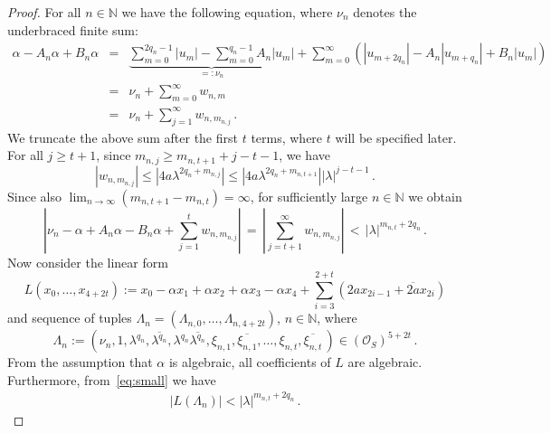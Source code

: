 \documentclass[a4paper,UKenglish,cleveref, autoref, thm-restate]{lipics-v2021}
\begin{document}
\begin{proof}
For all $n\in \mathbb N$ we have the following equation, where $\nu_n$ denotes the underbraced finite sum:
\begin{eqnarray*}
    \alpha - A_n \alpha + B_n \alpha &=& 
    \underbrace{\sum_{m=0}^{2q_n-1} |u_m| -\sum_{m=0}^{q_n-1} A_n|u_m|}_{=:\nu_n}+
    \sum_{m=0}^\infty \left(|u_{m+2q_n}|-A_n|u_{m+q_n}|+B_n|u_m| \right)\\
    &=& \nu_n +\sum_{m=0}^\infty w_{n,m}\\
    &=& \nu_n + \sum_{j=1}^\infty w_{n,m_{n,j}} \, .
\end{eqnarray*}
We truncate the above sum after the first $t$ terms, where $t$ will be specified later.  For all $j\geq t+1$,
since $m_{n,j} \geq m_{n,t+1}+j-t-1$, we have
\[ |w_{n,m_{n,j}}| \leq |4a\lambda^{2q_n+m_{n,j}}| \leq |4a\lambda^{2q_n+m_{n,t+1}}| |\lambda|^{j-t-1}\, .\] Since also
$\lim_{n\rightarrow \infty} (m_{n,t+1}-m_{n,t})=\infty$, for sufficiently large $n\in \mathbb N$ we obtain
\begin{equation}
      \left |\nu_n-\alpha + A_n\alpha - B_n\alpha + \sum_{j=1}^t w_{n,m_{n,j}}\right| \,= \, \left| \sum_{j=t+1}^\infty w_{n,m_{n,j}}\right|
\, < \, |\lambda|^{m_{n,t}+2q_n} \, .
\label{eq:small}
\end{equation}
Now consider the linear form 
\[L(x_0,\ldots,x_{4+2t}):= x_0 - \alpha x_1 +\alpha x_2+\alpha x_3-\alpha x_4+  \sum_{i=3}^{2+t} (2ax_{2i-1}+\overline{2a}x_{2i})  \]
and sequence of tuples $\Lambda_n=(\Lambda_{n,0},\ldots,\Lambda_{n,4+2t})$, $n \in \mathbb N$, where
\[ \Lambda_n := \left(\nu_n,1,\lambda^{q_n},\overline{\lambda^{q_n}},\lambda^{q_n}\overline{\lambda^{q_n}},\xi_{n,1},\overline{\xi_{n,1}},\ldots,\xi_{n,t},\overline{\xi_{n,t}} 
 \, \right) \in (\mathcal O_S)^{5+2t}\, . \]
 From the assumption that $\alpha$ is algebraic, all coefficients of $L$ are algebraic.  Furthermore, from~\eqref{eq:small} we have 
 \begin{gather}
|L(\Lambda_n)| < |\lambda|^{m_{n,t}+2q_n} \, .
     \label{eq:Lsmall}
 \end{gather}
 

\end{proof}
\end{document}
